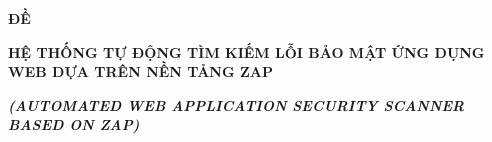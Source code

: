 \begin{titlepage}
    \centering
    
    \vspace*{20pt}

    \textbf{\large ĐỀ  }\\
    
    \vspace{10pt}
    
    \textbf{\LARGE HỆ THỐNG TỰ ĐỘNG TÌM KIẾM LỖI BẢO MẬT ỨNG DỤNG WEB DỰA TRÊN NỀN TẢNG ZAP }

    \vspace{10pt}

    \textbf{\textsl{\large (AUTOMATED WEB APPLICATION SECURITY SCANNER BASED ON ZAP)}}
\end{titlepage}